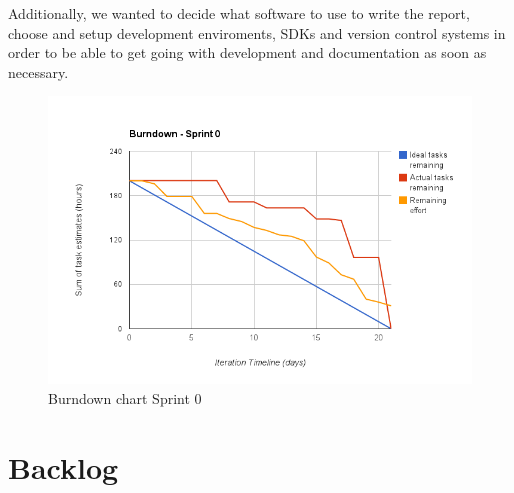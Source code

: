 Additionally, we wanted to decide what software to use to write the report,
choose and setup development enviroments, SDKs and version control systems in order to be able
to get going with development and documentation as soon as necessary.

\begin{figure}[h]
\centering
\includegraphics[scale=0.60]{../Figures/burndownSprint0.png}
\caption{Burndown chart Sprint 0}
\label{figure:burndownsprint0}
\end{figure}

\newpage
\section{Backlog}

